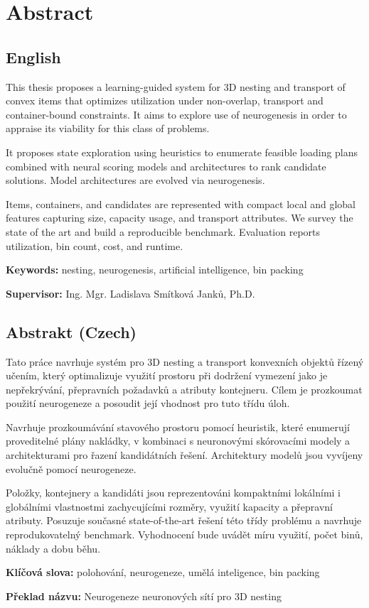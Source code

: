 \chapter*{Abstract}

\section*{English}
This thesis proposes a learning-guided system for 3D nesting and transport of convex items that optimizes utilization under non-overlap, transport and container-bound constraints. It aims to explore use of neurogenesis in order to appraise its viability for this class of problems.

It proposes state exploration using heuristics to enumerate feasible loading plans combined with neural scoring models and architectures to rank candidate solutions. Model architectures are evolved via neurogenesis.

Items, containers, and candidates are represented with compact local and global features capturing size, capacity usage, and transport attributes. We survey the state of the art and build a reproducible benchmark. Evaluation reports utilization, bin count, cost, and runtime.

\textbf{Keywords:} nesting, neurogenesis, artificial intelligence, bin packing

\textbf{Supervisor:} Ing. Mgr. Ladislava Smítková Janků, Ph.D.

\section*{Abstrakt (Czech)}
Tato práce navrhuje systém pro 3D nesting a transport konvexních objektů řízený učením, který optimalizuje využití prostoru při dodržení vymezení jako je nepřekrývání, přepravních požadavků a atributy kontejneru. Cílem je prozkoumat použití neurogeneze a posoudit její vhodnost pro tuto třídu úloh.

Navrhuje prozkoumávání stavového prostoru pomocí heuristik, které enumerují proveditelné plány nakládky, v kombinaci s neuronovými skórovacími modely a architekturami pro řazení kandidátních řešení. Architektury modelů jsou vyvíjeny evolučně pomocí neurogeneze.

Položky, kontejnery a kandidáti jsou reprezentováni kompaktními lokálními i globálními vlastnostmi zachycujícími rozměry, využití kapacity a přepravní atributy. Posuzuje současné state-of-the-art řešení této třídy problému a navrhuje reprodukovatelný benchmark. Vyhodnocení bude uvádět míru využití, počet binů, náklady a dobu běhu.

\textbf{Klíčová slova:} polohování, neurogeneze, umělá inteligence, bin packing

\textbf{Překlad názvu:} Neurogeneze neuronových sítí pro 3D nesting
